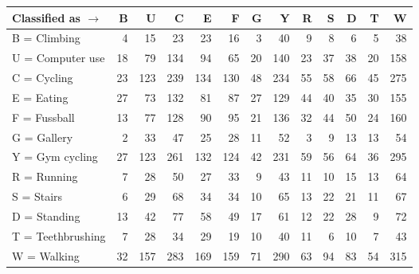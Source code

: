 \begin{tabular}{lrrrrrrrrrrrr}
\toprule
Classified as $\rightarrow$ &   B &    U &    C &    E &    F &   G &    Y &   R &   S &   D &   T &    W \\
\midrule
B = Climbing      &   4 &   15 &   23 &   23 &   16 &   3 &   40 &   9 &   8 &   6 &   5 &   38 \\
U = Computer use  &  18 &   79 &  134 &   94 &   65 &  20 &  140 &  23 &  37 &  38 &  20 &  158 \\
C = Cycling       &  23 &  123 &  239 &  134 &  130 &  48 &  234 &  55 &  58 &  66 &  45 &  275 \\
E = Eating        &  27 &   73 &  132 &   81 &   87 &  27 &  129 &  44 &  40 &  35 &  30 &  155 \\
F = Fussball      &  13 &   77 &  128 &   90 &   95 &  21 &  136 &  32 &  44 &  50 &  24 &  160 \\
G = Gallery       &   2 &   33 &   47 &   25 &   28 &  11 &   52 &   3 &   9 &  13 &  13 &   54 \\
Y = Gym cycling   &  27 &  123 &  261 &  132 &  124 &  42 &  231 &  59 &  56 &  64 &  36 &  295 \\
R = Running       &   7 &   28 &   50 &   27 &   33 &   9 &   43 &  11 &  10 &  15 &  13 &   64 \\
S = Stairs        &   6 &   29 &   68 &   34 &   34 &  10 &   65 &  13 &  22 &  21 &  11 &   67 \\
D = Standing      &  13 &   42 &   77 &   58 &   49 &  17 &   61 &  12 &  22 &  28 &   9 &   72 \\
T = Teethbrushing &   7 &   28 &   34 &   29 &   19 &  10 &   40 &  11 &   6 &  10 &   7 &   43 \\
W = Walking       &  32 &  157 &  283 &  169 &  159 &  71 &  290 &  63 &  94 &  83 &  54 &  315 \\
\bottomrule
\end{tabular}
